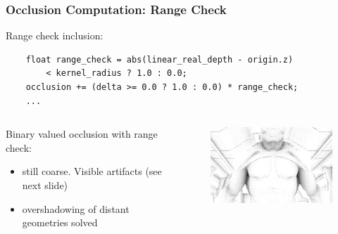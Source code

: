\documentclass{beamer}
\begin{document}
\begin{frame}[fragile]
\frametitle{Occlusion Computation: Range Check}
Range check inclusion:
\begin{verbatim}
    float range_check = abs(linear_real_depth - origin.z)
        < kernel_radius ? 1.0 : 0.0;
    occlusion += (delta >= 0.0 ? 1.0 : 0.0) * range_check;
    ...
\end{verbatim}

\begin{columns}
    \begin{column}{0.45\linewidth}
        Binary valued occlusion with range check:
        \begin{itemize}
            \item still coarse. Visible artifacts (see next slide)
            \item overshadowing of distant geometries solved
        \end{itemize}
    \end{column}
    \begin{column}{0.45\linewidth}
        \begin{figure}
            \centering
            \includegraphics[width=0.8\linewidth]{images/occlusion_hard_range_check.png}
        \end{figure}
    \end{column}
\end{columns}

\end{frame}
\end{document}

